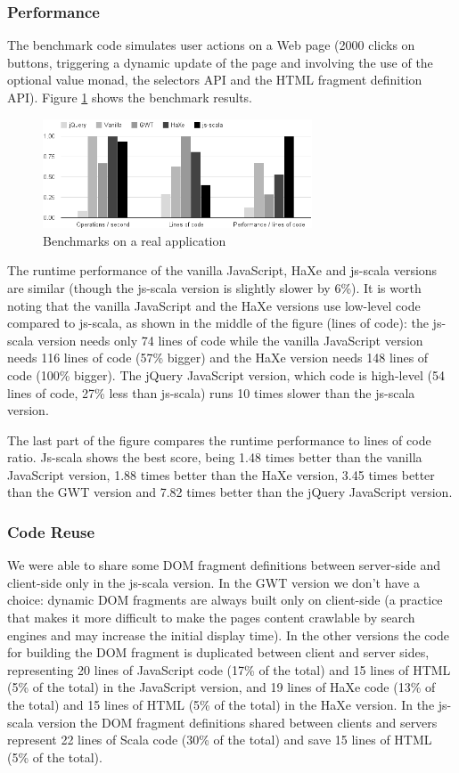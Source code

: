 \documentclass[preprint]{sigplanconf}
\begin{document}
\subsubsection{Performance}

The benchmark code simulates user actions on a Web page (2000 clicks on buttons, triggering a
dynamic update of the page and involving the use of the optional value monad, the selectors API and
the HTML fragment definition API). Figure \ref{benchmark} shows the benchmark results.

\begin{figure}
\centering
\includegraphics[width=8cm]{chooze.png}
\caption{Benchmarks on a real application}
\label{benchmark}
\end{figure}

The runtime performance of the vanilla JavaScript, HaXe and js-scala versions are similar (though
the js-scala version is slightly slower by 6\%). It is worth noting that the vanilla JavaScript and
the HaXe versions use low-level code compared to js-scala, as shown in the middle of the figure
(lines of code): the js-scala version needs only 74 lines of code while the vanilla JavaScript
version needs 116 lines of code (57\% bigger) and the HaXe version needs 148 lines of code (100\%
bigger). The jQuery JavaScript version, which code is high-level (54 lines of code, 27\% less
than js-scala) runs 10 times slower than the js-scala version.

The last part of the figure compares the runtime performance to lines of code ratio. Js-scala shows
the best score, being 1.48 times better than the vanilla JavaScript version, 1.88 times better than
the HaXe version, 3.45 times better than the GWT version and 7.82 times better than the jQuery
JavaScript version.

\subsubsection{Code Reuse}

We were able to share some DOM fragment definitions between server-side and client-side only in
the js-scala version. In the GWT version we don’t have a choice: dynamic DOM fragments are always
built only on client-side (a practice that makes it more difficult to make the pages content
crawlable by search engines and may increase the initial display time). In the other versions the
code for building the DOM fragment is duplicated between client and server sides, representing 20
lines of JavaScript code (17\% of the total) and 15 lines of HTML (5\% of the total) in the
JavaScript version, and 19 lines of HaXe code (13\% of the total) and 15 lines of HTML (5\%
of the total) in the HaXe version. In the js-scala version the DOM fragment definitions shared
between clients and servers represent 22 lines of Scala code (30\% of the total) and save 15 lines
of HTML (5\% of the total).
\end{document}
